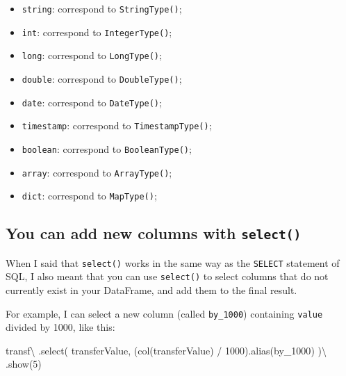 \documentclass[
  11pt,
  letterpaper,
  DIV=11,
  numbers=noendperiod]{scrreprt}
\newenvironment{Shaded}{\begin{snugshade}}{\end{snugshade}}
\newcommand{\DecValTok}[1]{\textcolor[rgb]{0.68,0.00,0.00}{#1}}
\newcommand{\NormalTok}[1]{\textcolor[rgb]{0.00,0.23,0.31}{#1}}
\newcommand{\OperatorTok}[1]{\textcolor[rgb]{0.37,0.37,0.37}{#1}}
\newcommand{\StringTok}[1]{\textcolor[rgb]{0.13,0.47,0.30}{#1}}
\providecommand{\tightlist}{%
  \setlength{\itemsep}{0pt}\setlength{\parskip}{0pt}}\usepackage{longtable,booktabs,array}
\begin{document}
\begin{itemize}
\tightlist
\item
  \texttt{\textquotesingle{}string\textquotesingle{}}: correspond to
  \texttt{StringType()};
\item
  \texttt{\textquotesingle{}int\textquotesingle{}}: correspond to
  \texttt{IntegerType()};
\item
  \texttt{\textquotesingle{}long\textquotesingle{}}: correspond to
  \texttt{LongType()};
\item
  \texttt{\textquotesingle{}double\textquotesingle{}}: correspond to
  \texttt{DoubleType()};
\item
  \texttt{\textquotesingle{}date\textquotesingle{}}: correspond to
  \texttt{DateType()};
\item
  \texttt{\textquotesingle{}timestamp\textquotesingle{}}: correspond to
  \texttt{TimestampType()};
\item
  \texttt{\textquotesingle{}boolean\textquotesingle{}}: correspond to
  \texttt{BooleanType()};
\item
  \texttt{\textquotesingle{}array\textquotesingle{}}: correspond to
  \texttt{ArrayType()};
\item
  \texttt{\textquotesingle{}dict\textquotesingle{}}: correspond to
  \texttt{MapType()};
\end{itemize}

\hypertarget{you-can-add-new-columns-with-select}{%
\subsection{\texorpdfstring{You can add new columns with
\texttt{select()}}{You can add new columns with select()}}\label{you-can-add-new-columns-with-select}}

When I said that \texttt{select()} works in the same way as the
\texttt{SELECT} statement of SQL, I also meant that you can use
\texttt{select()} to select columns that do not currently exist in your
DataFrame, and add them to the final result.

For example, I can select a new column (called \texttt{by\_1000})
containing \texttt{value} divided by 1000, like this:

\begin{Shaded}
\begin{Highlighting}[]
\NormalTok{transf}\OperatorTok{\textbackslash{}}
\NormalTok{  .select(}
    \StringTok{\textquotesingle{}transferValue\textquotesingle{}}\NormalTok{,}
\NormalTok{    (col(}\StringTok{\textquotesingle{}transferValue\textquotesingle{}}\NormalTok{) }\OperatorTok{/} \DecValTok{1000}\NormalTok{).alias(}\StringTok{\textquotesingle{}by\_1000\textquotesingle{}}\NormalTok{)}
\NormalTok{  )}\OperatorTok{\textbackslash{}}
\NormalTok{  .show(}\DecValTok{5}\NormalTok{)}
\end{Highlighting}
\end{Shaded}
\end{document}
